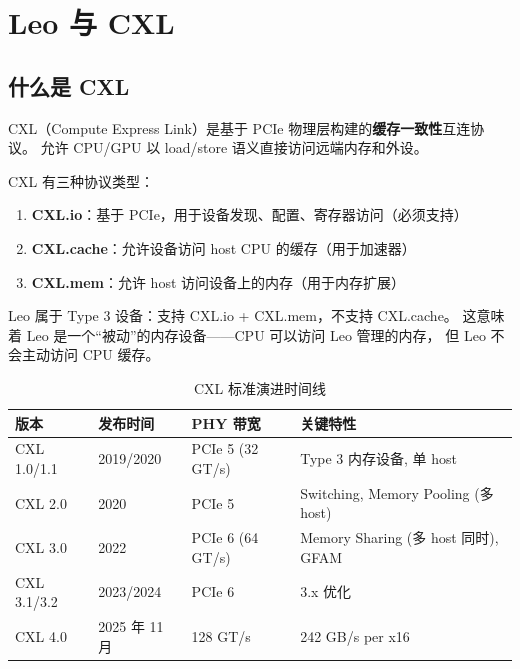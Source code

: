 
\section{Leo 与 CXL}

\subsection{什么是 CXL}

CXL（Compute Express Link）是基于 PCIe 物理层构建的\textbf{缓存一致性}互连协议。
允许 CPU/GPU 以 load/store 语义直接访问远端内存和外设。

CXL 有三种协议类型：
\begin{enumerate}
    \item \textbf{CXL.io}：基于 PCIe，用于设备发现、配置、寄存器访问（必须支持）
    \item \textbf{CXL.cache}：允许设备访问 host CPU 的缓存（用于加速器）
    \item \textbf{CXL.mem}：允许 host 访问设备上的内存（用于内存扩展）
\end{enumerate}

Leo 属于 Type 3 设备：支持 CXL.io + CXL.mem，不支持 CXL.cache。
这意味着 Leo 是一个``被动''的内存设备——CPU 可以访问 Leo 管理的内存，
但 Leo 不会主动访问 CPU 缓存。

\begin{table}[htb]
    \centering
    \caption{CXL 标准演进时间线}
    \label{tab:cxl-evolution}
    \begin{tabular}{llll}
        \toprule
        \textbf{版本} & \textbf{发布时间} & \textbf{PHY 带宽} & \textbf{关键特性} \\
        \midrule
        CXL 1.0/1.1 & 2019/2020 & PCIe 5 (32 GT/s) & Type 3 内存设备, 单 host \\
        CXL 2.0 & 2020 & PCIe 5 & Switching, Memory Pooling (多 host) \\
        CXL 3.0 & 2022 & PCIe 6 (64 GT/s) & Memory Sharing (多 host 同时), GFAM \\
        CXL 3.1/3.2 & 2023/2024 & PCIe 6 & 3.x 优化 \\
        CXL 4.0 & 2025 年 11 月 & 128 GT/s & 242 GB/s per x16 \\
        \bottomrule
    \end{tabular}
\end{table}

